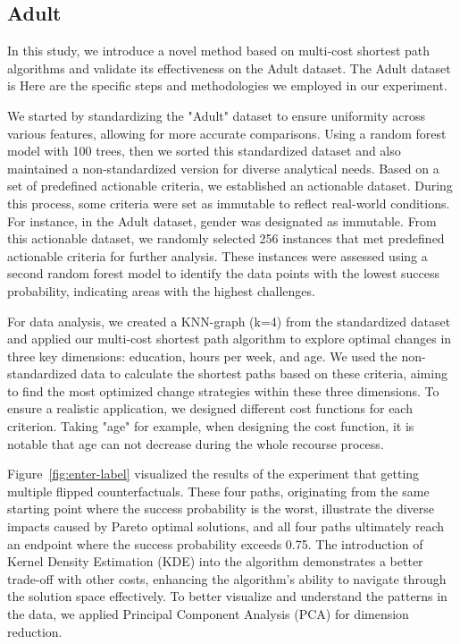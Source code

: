 \subsection{Adult}


    In this study, we introduce a novel method based on multi-cost shortest path algorithms and validate its effectiveness on the Adult dataset. The Adult dataset is Here are the specific steps and methodologies we employed in our experiment.


We started by standardizing the "Adult" dataset to ensure uniformity across various features, allowing for more accurate comparisons. Using a random forest model with 100 trees, then we sorted this standardized dataset and also maintained a non-standardized version for diverse analytical needs. Based on a set of predefined actionable criteria, we established an actionable dataset. During this process, some criteria were set as immutable to reflect real-world conditions. For instance, in the Adult dataset, gender was designated as immutable. From this actionable dataset, we randomly selected 256 instances that met predefined actionable criteria for further analysis. These instances were assessed using a second random forest model to identify the data points with the lowest success probability, indicating areas with the highest challenges.

For data analysis, we created a KNN-graph (k=4) from the standardized dataset and applied our multi-cost shortest path algorithm to explore optimal changes in three key dimensions: education, hours per week, and age. We used the non-standardized data to calculate the shortest paths based on these criteria, aiming to find the most optimized change strategies within these three dimensions. To ensure a realistic application, we designed different cost functions for each criterion. Taking "age" for example, when designing the cost function, it is notable that age can not decrease during the whole recourse process. %
    
Figure~\ref{fig:enter-label} visualized the results of the experiment that getting multiple flipped counterfactuals. These four paths, originating from the same starting point where the success probability is the worst, illustrate the diverse impacts caused by Pareto optimal solutions, and all four paths ultimately reach an endpoint where the success probability exceeds 0.75. The introduction of Kernel Density Estimation (KDE) into the algorithm demonstrates a better trade-off with other costs, enhancing the algorithm's ability to navigate through the solution space effectively. To better visualize and understand the patterns in the data, we applied Principal Component Analysis (PCA) for dimension reduction.

